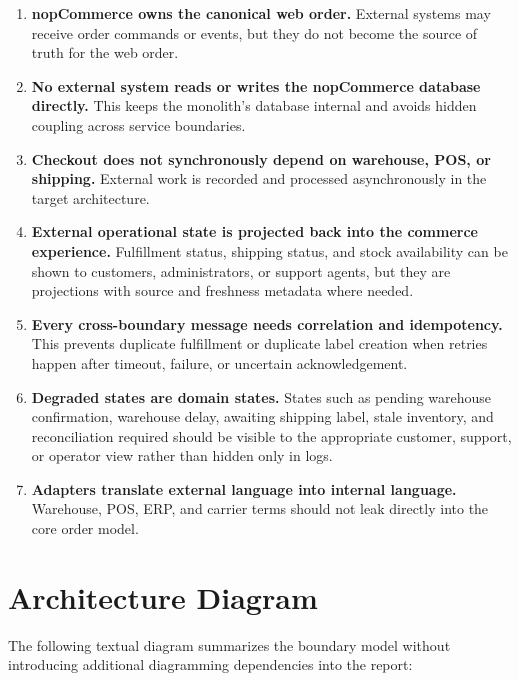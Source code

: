 \begin{enumerate}
    \item \textbf{nopCommerce owns the canonical web order.} External systems may receive
    order commands or events, but they do not become the source of truth for the web order.

    \item \textbf{No external system reads or writes the nopCommerce database directly.} This
    keeps the monolith's database internal and avoids hidden coupling across service
    boundaries.

    \item \textbf{Checkout does not synchronously depend on warehouse, POS, or shipping.}
    External work is recorded and processed asynchronously in the target architecture.

    \item \textbf{External operational state is projected back into the commerce experience.}
    Fulfillment status, shipping status, and stock availability can be shown to customers,
    administrators, or support agents, but they are projections with source and freshness
    metadata where needed.

    \item \textbf{Every cross-boundary message needs correlation and idempotency.} This
    prevents duplicate fulfillment or duplicate label creation when retries happen after
    timeout, failure, or uncertain acknowledgement.

    \item \textbf{Degraded states are domain states.} States such as pending warehouse
    confirmation, warehouse delay, awaiting shipping label, stale inventory, and reconciliation
    required should be visible to the appropriate customer, support, or operator view rather than
    hidden only in logs.

    \item \textbf{Adapters translate external language into internal language.} Warehouse,
    POS, ERP, and carrier terms should not leak directly into the core order model.
\end{enumerate}

\section{Architecture Diagram}

The following textual diagram summarizes the boundary model without introducing additional
diagramming dependencies into the report:

